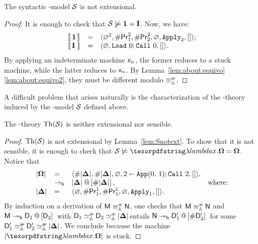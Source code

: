 \begin{lem}\label{lem:Snotext}
The syntactic \lam-model $\cS$ is not extensional.
\end{lem}

\begin{proof} It is enough to check that $\cS\not\models \comb{1} = \comb{I}$. Now, we have:
\[
	\begin{array}{lll}
	\Int{\,\comb{1}\,}{} &=& \tuple{\Null^2,\Lookup\mach{Pr}^2_1,\Lookup\mach{Pr}^2_2,\Null,\ins{Apply}_2,[]};\\
	\Int{\,\comb{I}\ }{} &=& \tuple{\Null,\Load 0;\Call 0,[]}.\\
	\end{array}
\]
By applying an indeterminate machine $\mach{x}_n$, the former reduces to a stuck machine, while the latter reduces to $\mach{x}_n$. By Lemma~\ref{lem:about:equivo}\ref{lem:about:equivo2}, they must be different modulo $\equivea$.
\end{proof}

A difficult problem that arises naturally is the characterization of the \lam-theory induced by the \lam-model $\cS$ defined above.

\begin{prop}\label{prop:aboutThS}
The \lam-theory $\Th{\cS}$ is neither extensional nor sensible.
\end{prop}

\begin{proof} $\Th{\cS}$ is not extensional by Lemma~\ref{lem:Snotext}. To show that it is not sensible, it is enough to check that $\cS\not\models \lam x.\Om = \Om$. Notice that
\[
	\begin{array}{llll}
	\CInt[]{\Om}&=&\tuple{\Lookup\CInt[]{\comb{\Delta}},\Lookup\CInt[]{\comb{\Delta}},\Null,\Apply 012;\Call 2,[]},\\
	&\redh&\append{\CInt[]{\comb{\Delta}}}{\Lookup\CInt[]{\comb{\Delta}}},&\textrm{where:}\\
	\CInt[]{\comb{\Delta}}&=&\tuple{\Null,\Lookup\mach{Pr}^1_1,\Lookup\mach{Pr}^1_1,\Null,\ins{Apply}_1,[]}.\\
	\end{array}
\]
By induction on a derivation of $\mM\equivea \mN$, one checks that $\mM\equivea \mN$ and $\mM\reddh \append{\mach{D}_1}{\mach{D}_2}$ with $\mach{D}_1\simea \mach{D}_2\simea\CInt[]{\comb{\Delta}}$entails $\mN\reddh\append{\mach{D}'_1}{\Lookup\mach{D}'_2}$ for some $\mach{D}'_1\simea\mach{D}'_2\simea\CInt[]{\comb{\Delta}}$. We conclude because the machine $\CInt[]{\lam x.\Om}$ is stuck.
\end{proof}


